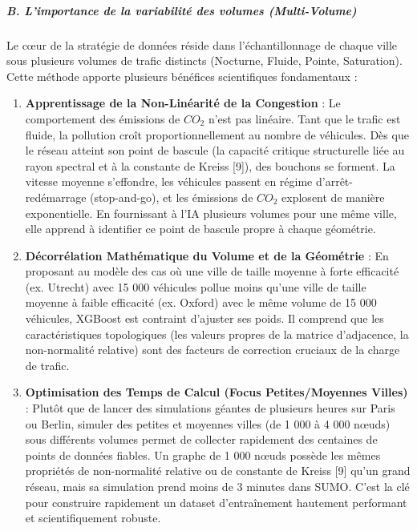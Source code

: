 \documentclass[10pt, a4paper]{article}
\providecommand{\tightlist}{}
\begin{document}
\subparagraph{B. L'importance de la variabilité des volumes
(Multi-Volume)}\label{b.-limportance-de-la-variabilituxe9-des-volumes-multi-volume}

Le cœur de la stratégie de données réside dans l'échantillonnage de
chaque ville sous plusieurs volumes de trafic distincts (Nocturne,
Fluide, Pointe, Saturation). Cette méthode apporte plusieurs bénéfices
scientifiques fondamentaux :

\begin{enumerate}
\def\labelenumi{\arabic{enumi}.}
\tightlist
\item
  \textbf{Apprentissage de la Non-Linéarité de la Congestion} : Le
  comportement des émissions de \(CO_2\) n'est pas linéaire. Tant que le
  trafic est fluide, la pollution croît proportionnellement au nombre de
  véhicules. Dès que le réseau atteint son point de bascule (la capacité
  critique structurelle liée au rayon spectral et à la constante de
  Kreiss {[}9{]}), des bouchons se forment. La vitesse moyenne
  s'effondre, les véhicules passent en régime d'arrêt-redémarrage
  (stop-and-go), et les émissions de \(CO_2\) explosent de manière
  exponentielle. En fournissant à l'IA plusieurs volumes pour une même
  ville, elle apprend à identifier ce point de bascule propre à chaque
  géométrie.
\item
  \textbf{Décorrélation Mathématique du Volume et de la Géométrie} : En
  proposant au modèle des cas où une ville de taille moyenne à forte
  efficacité (ex. Utrecht) avec 15 000 véhicules pollue moins qu'une
  ville de taille moyenne à faible efficacité (ex. Oxford) avec le même
  volume de 15 000 véhicules, XGBoost est contraint d'ajuster ses poids.
  Il comprend que les caractéristiques topologiques (les valeurs propres
  de la matrice d'adjacence, la non-normalité relative) sont des
  facteurs de correction cruciaux de la charge de trafic.
\item
  \textbf{Optimisation des Temps de Calcul (Focus Petites/Moyennes
  Villes)} : Plutôt que de lancer des simulations géantes de plusieurs
  heures sur Paris ou Berlin, simuler des petites et moyennes villes (de
  1 000 à 4 000 nœuds) sous différents volumes permet de collecter
  rapidement des centaines de points de données fiables. Un graphe de 1
  000 nœuds possède les mêmes propriétés de non-normalité relative ou de
  constante de Kreiss {[}9{]} qu'un grand réseau, mais sa simulation
  prend moins de 3 minutes dans SUMO. C'est la clé pour construire
  rapidement un dataset d'entraînement hautement performant et
  scientifiquement robuste.
\end{enumerate}
\end{document}
